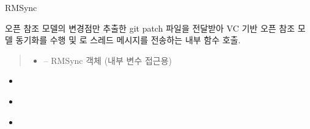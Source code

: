 \documentclass[a4paper,10pt,english]{sphinxmanual}
\begin{document}
\begin{fulllineitems}
\label{\detokenize{_RMSync:RMSync}}
\pysigstartsignatures
{}
\pysigstopsignatures
\sphinxAtStartPar
RMSync

\begin{fulllineitems}
\label{\detokenize{_RMSync:RMSync.Subscribe}}
\pysigstartsignatures
{}
\pysigstopsignatures
\sphinxAtStartPar
오픈 참조 모델의 변경점만 추출한 git patch 파일을 전달받아 VC 기반 오픈 참조 모델 동기화를 수행 및
{\hyperref[\detokenize{_DHDaemon:dhdaemon}]{}} 로  스레드 메시지를 전송하는 내부 함수 호출.
\begin{quote}\begin{description}
\begin{itemize}
\item {} 
\sphinxAtStartPar
{} – RMSync 객체 (내부 변수 접근용)

\end{itemize}

\end{description}\end{quote}


\nopagebreak

\begin{itemize}
\item {} 
\sphinxAtStartPar
{\hyperref[\detokenize{_RMSync:RMSync._setRMSyncServer}]{}}

\item {} 
\sphinxAtStartPar
{\hyperref[\detokenize{_RMSync:RMSync.gitPatch}]{}}

\item {} 
\sphinxAtStartPar
{\hyperref[\detokenize{_RMSync:RMSync._dmUpdateReferenceModel}]{}}

\end{itemize}




\end{fulllineitems}
\end{fulllineitems}
\end{document}
